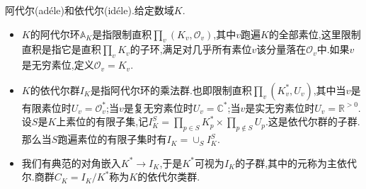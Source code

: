 阿代尔(ad\'ele)和依代尔(id\'ele).给定数域$K$.
\begin{itemize}
	\item $K$的阿代尔环$\mathbb{A}_K$是指限制直积$\prod_v(K_v,\mathscr{O}_v)$,其中$v$跑遍$K$的全部素位,这里限制直积是指它是直积$\prod_vK_v$的子环,满足对几乎所有素位$v$该分量落在$\mathscr{O}_v$中.如果$v$是无穷素位,定义$\mathscr{O}_v=K_v$.
	\item $K$的依代尔群$I_K$是指阿代尔环的乘法群.也即限制直积$\prod_v(K_v^*,U_v)$,其中当$v$是有限素位时$U_v=\mathscr{O}_v^*$;当$v$是复无穷素位时$U_v=\mathbb{C}^*$;当$v$是实无穷素位时$U_v=\mathbb{R}^{>0}$.设$S$是$K$上素位的有限子集,记$I_K^S=\prod_{p\in S}K_p^*\times\prod_{p\not\in S}U_p$.这是依代尔群的子群.那么当$S$跑遍素位的有限子集时有$I_K=\cup_SI_K^S$.
	\item 我们有典范的对角嵌入$K^*\to I_K$,于是$K^*$可视为$I_K$的子群,其中的元称为主依代尔.商群$C_K=I_K/K^*$称为$K$的依代尔类群.
\end{itemize}

